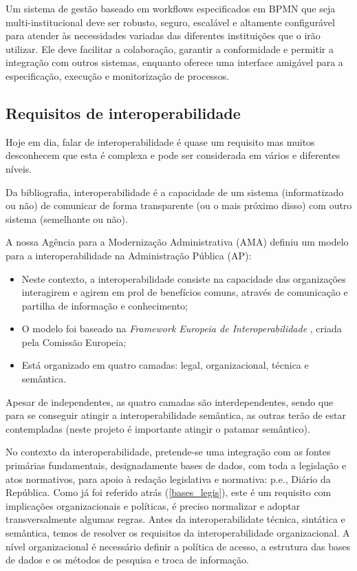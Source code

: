Um sistema de gestão baseado em workflows especificados em BPMN que seja multi-institucional deve 
ser robusto, seguro, escalável e altamente configurável para atender às necessidades variadas das 
diferentes instituições que o irão utilizar. 
Ele deve facilitar a colaboração, garantir a conformidade e permitir a integração com outros 
sistemas, enquanto oferece uma interface amigável para a especificação, execução e monitorização 
de processos.


\subsection{Requisitos de interoperabilidade}

Hoje em dia, falar de interoperabilidade é quase um requisito mas muitos desconhecem que esta é complexa 
e pode ser considerada em vários e diferentes níveis.

Da bibliografia, interoperabilidade é a capacidade de um sistema (informatizado ou não) de comunicar de 
forma transparente (ou o mais próximo disso) com outro sistema (semelhante ou não).

A nossa Agência para a Modernização Administrativa (AMA)  definiu um modelo para a interoperabilidade na 
Administração Pública (AP):
\begin{itemize}
\item Neste contexto, a interoperabilidade consiste na capacidade das organizações interagirem 
e agirem em prol de benefícios comuns, através de comunicação e partilha de informação e conhecimento;
\item O modelo foi baseado na \emph{Framework Europeia de Interoperabilidade} \cite{EIF}, criada pela Comissão Europeia;
\item Está organizado em quatro camadas: legal, organizacional, técnica e semântica.
\end{itemize}

Apesar de independentes, as quatro camadas são interdependentes, sendo que para se conseguir atingir a interoperabilidade 
semântica, as outras terão de estar contempladas (neste projeto é importante atingir o patamar semântico).

No contexto da interoperabilidade, pretende-se uma integração com as fontes primárias fundamentais, 
designadamente bases de dados, com toda a
legislação e atos normativos, para apoio à redação legislativa e normativa: p.e., Diário da
República. Como já foi referido atrás (\ref{bases_legis}), este é um requisito com implicações
organizacionais e políticas, é preciso normalizar e adoptar transversalmente algumas regras. Antes da 
interoperabilidate técnica, sintática e semântica, temos de resolver os requisitos da 
interoperabilidade organizacional. 
A nível organizacional é necessário definir a política de acesso, a estrutura das bases de dados e os métodos de 
pesquisa e troca de informação.


